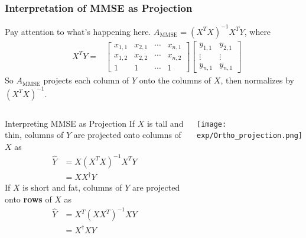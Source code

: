 \documentclass{beamer}
\begin{document}
\begin{frame}
  \frametitle{Interpretation of MMSE as Projection}

  Pay attention to what's happening here. $A_{\text{MMSE}} = (X^TX)^{-1}X^TY$, where
  \begin{align*}
    &X^TY=
    &
    \left[\begin{array}{cccc}
        x_{1,1}&x_{2,1}&\cdots&x_{n,1}\\
        x_{1,2}&x_{2,2}&\cdots&x_{n,2}\\
        1&1&\cdots&1
      \end{array}\right]
    \left[\begin{array}{cc}
        y_{1,1}&y_{2,1}\\
        \vdots&\vdots\\
        y_{n,1}&y_{n,1}
      \end{array}\right]
  \end{align*}
  So $A_{\text{MMSE}}$ projects each column of $Y$ onto the columns of $X$, then
  normalizes by $(X^TX)^{-1}$.
\end{frame}

\begin{frame}
  \begin{columns}[t]
    \column{2.5in}
    \begin{block}{Interpreting MMSE as Projection}
      If $X$ is tall and thin, columns of $Y$ are projected onto
      columns of $X$ as
      \begin{align*}
        \hat{Y}&=X(X^TX)^{-1}X^TY\\
        &=XX^\dag Y
      \end{align*}
      If $X$ is short and fat, columns of $Y$ are projected onto
      {\bf rows} of $X$ as
      \begin{align*}
        \hat{Y}&=X^T(XX^T)^{-1}XY\\
        &=X^\dag XY
      \end{align*}
    \end{block}
    \column{2.25in}
    \begin{block}{}
      \centerline{\texttt{[image: exp/Ortho\_projection.png]}}
    \end{block}
  \end{columns}
\end{frame}
\end{document}
